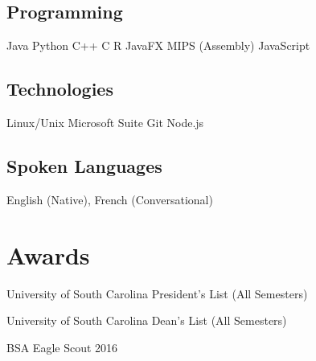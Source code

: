 \documentclass[letterpaper]{deedy-resume}
\begin{document}
\begin{minipage}[t]{0.29\textwidth}
\subsection{Programming}
Java \textbullet{} Python \textbullet{} C++ \textbullet{} C \textbullet{} R \textbullet{} JavaFX MIPS (Assembly) \textbullet{} JavaScript
\sectionspace

\subsection{Technologies}
Linux/Unix \textbullet{} Microsoft Suite \textbullet{} Git Node.js 
\sectionspace 

\subsection{Spoken Languages}
English (Native), French (Conversational)


\sectionspace

\section{Awards}
\vspace{0.2cm}
\setlength{\leftmargini}{1em}
\begin{tightitemize}
\item University of South Carolina President's List (All Semesters)
\item University of South Carolina Dean's List (All Semesters)
\item BSA Eagle Scout 2016
\end{tightitemize}


\sectionspace


\sectionspace 

\end{minipage} 
\hfill
%
%
\end{document}

